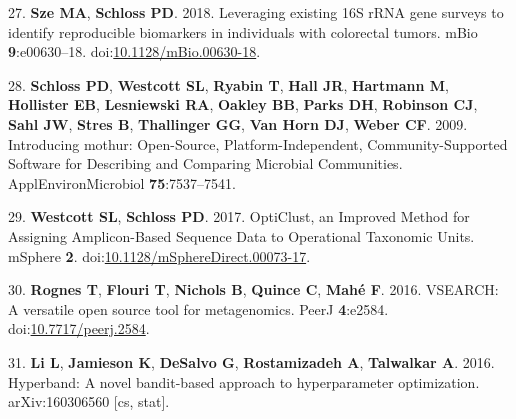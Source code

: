 \documentclass[11pt,]{article}
\begin{document}
\hypertarget{ref-sze_leveraging_2018}{}
27. \textbf{Sze MA}, \textbf{Schloss PD}. 2018. Leveraging existing 16S
rRNA gene surveys to identify reproducible biomarkers in individuals
with colorectal tumors. mBio \textbf{9}:e00630--18.
doi:\href{https://doi.org/10.1128/mBio.00630-18}{10.1128/mBio.00630-18}.

\hypertarget{ref-schloss_introducing_2009}{}
28. \textbf{Schloss PD}, \textbf{Westcott SL}, \textbf{Ryabin T},
\textbf{Hall JR}, \textbf{Hartmann M}, \textbf{Hollister EB},
\textbf{Lesniewski RA}, \textbf{Oakley BB}, \textbf{Parks DH},
\textbf{Robinson CJ}, \textbf{Sahl JW}, \textbf{Stres B},
\textbf{Thallinger GG}, \textbf{Van Horn DJ}, \textbf{Weber CF}. 2009.
Introducing mothur: Open-Source, Platform-Independent,
Community-Supported Software for Describing and Comparing Microbial
Communities. ApplEnvironMicrobiol \textbf{75}:7537--7541.

\hypertarget{ref-westcott_opticlust_2017}{}
29. \textbf{Westcott SL}, \textbf{Schloss PD}. 2017. OptiClust, an
Improved Method for Assigning Amplicon-Based Sequence Data to
Operational Taxonomic Units. mSphere \textbf{2}.
doi:\href{https://doi.org/10.1128/mSphereDirect.00073-17}{10.1128/mSphereDirect.00073-17}.

\hypertarget{ref-rognes_vsearch_2016}{}
30. \textbf{Rognes T}, \textbf{Flouri T}, \textbf{Nichols B},
\textbf{Quince C}, \textbf{Mahé F}. 2016. VSEARCH: A versatile open
source tool for metagenomics. PeerJ \textbf{4}:e2584.
doi:\href{https://doi.org/10.7717/peerj.2584}{10.7717/peerj.2584}.

\hypertarget{ref-li_hyperband:_2016}{}
31. \textbf{Li L}, \textbf{Jamieson K}, \textbf{DeSalvo G},
\textbf{Rostamizadeh A}, \textbf{Talwalkar A}. 2016. Hyperband: A novel
bandit-based approach to hyperparameter optimization. arXiv:160306560
{[}cs, stat{]}.
\end{document}
